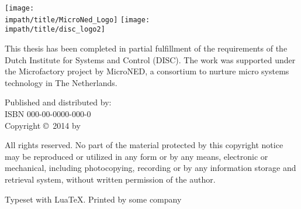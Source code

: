 \vspace{20mm}
\begin{center}
    \Large\ilhana
\end{center}
\newpage
\thispagestyle{empty}
\smallskip\noindent
{
\flushleft\texttt{[image: \\impath/title/MicroNed\_Logo]}\hspace*{0.75cm}
\vspace{1em}
\texttt{[image: \\impath/title/disc\_logo2]}
\vspace{1em}


\parbox{\textwidth}{\noindent This thesis has been completed in partial fulfillment of
the requirements of the Dutch Institute for Systems and Control
(DISC). The work was supported under the Microfactory project by
MicroNED, a consortium to nurture micro systems technology in
The Netherlands.
}
\vfill

Published and distributed by: \ilhana\\

\bigskip{}
ISBN 000-00-0000-000-0\\
Copyright \copyright~2014 by \ilhana
}


\bigskip{}
\noindent All rights reserved. No part of the material protected by
this copyright notice may be reproduced or utilized in any form or
by any means, electronic or mechanical, including photocopying,
recording or by any information storage and retrieval system,
without written permission of the author.

\bigskip{}
\noindent Typeset with Lua\kern-0.9bp\TeX. Printed by some company
